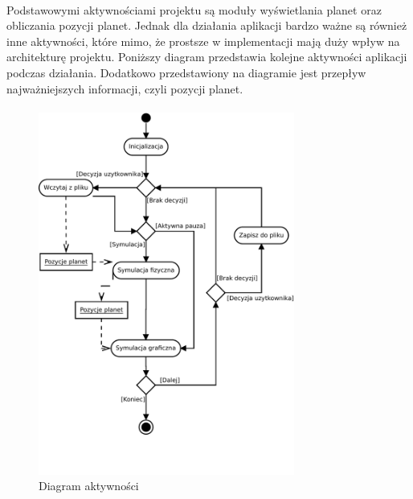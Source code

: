 \paragraph{}

Podstawowymi aktywnościami projektu są moduły wyświetlania planet oraz obliczania pozycji planet. Jednak dla działania aplikacji bardzo ważne są również inne aktywności, które mimo, że prostsze w implementacji mają duży wpływ na architekturę projektu. Poniższy diagram przedstawia kolejne aktywności aplikacji podczas działania. Dodatkowo przedstawiony na diagramie jest przepływ najważniejszych informacji, czyli pozycji planet.

\paragraph{}

\begin{figure}[ht!]
	\centering
	\includegraphics[width=0.75\textwidth]{activity.pdf}
	\caption{Diagram aktywności}
	\label{fig:activity}
\end{figure}


